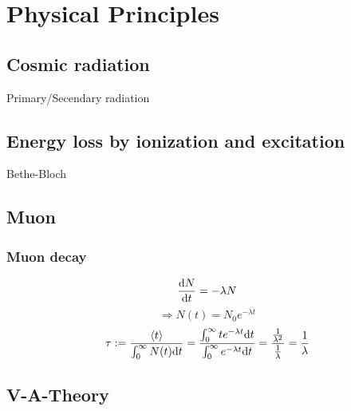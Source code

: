 \section{Physical Principles}
\subsection{Cosmic radiation}
Primary/Secendary radiation
\subsection{Energy loss by ionization and excitation}
Bethe-Bloch
\subsection{Muon}
\subsubsection{Muon decay}
\label{sub:decay}
\begin{equation}
	\frac{\mathrm{d} N}{\mathrm{d} t} = - \lambda N
\end{equation}
\begin{equation}
    \Rightarrow N(t) = N_0 e^{-\lambda t}
\end{equation}
\begin{equation}
    \tau := \frac{\left<t\right>}{\int_0^\infty N(t) \mathrm{d} t} = 
    \frac{\int_0^\infty t e^{-\lambda t} \mathrm{d} t}{\int_0^\infty e^{-\lambda t} \mathrm{d} t} = 
    \frac{\frac{1}{\lambda^2}}{\frac{1}{\lambda}} = \frac{1}{\lambda}
\end{equation}
\subsection{V-A-Theory}